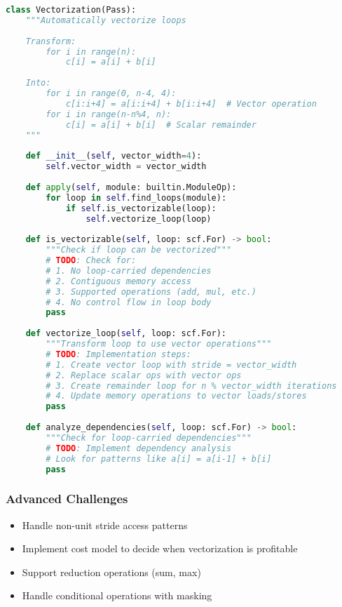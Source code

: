 \documentclass[11pt,a4paper]{article}
\begin{document}
\begin{lstlisting}[language=Python, caption=Exercise: Auto-Vectorization]
class Vectorization(Pass):
    """Automatically vectorize loops
    
    Transform:
        for i in range(n):
            c[i] = a[i] + b[i]
    
    Into:
        for i in range(0, n-4, 4):
            c[i:i+4] = a[i:i+4] + b[i:i+4]  # Vector operation
        for i in range(n-n%4, n):
            c[i] = a[i] + b[i]  # Scalar remainder
    """
    
    def __init__(self, vector_width=4):
        self.vector_width = vector_width
    
    def apply(self, module: builtin.ModuleOp):
        for loop in self.find_loops(module):
            if self.is_vectorizable(loop):
                self.vectorize_loop(loop)
    
    def is_vectorizable(self, loop: scf.For) -> bool:
        """Check if loop can be vectorized"""
        # TODO: Check for:
        # 1. No loop-carried dependencies
        # 2. Contiguous memory access
        # 3. Supported operations (add, mul, etc.)
        # 4. No control flow in loop body
        pass
    
    def vectorize_loop(self, loop: scf.For):
        """Transform loop to use vector operations"""
        # TODO: Implementation steps:
        # 1. Create vector loop with stride = vector_width
        # 2. Replace scalar ops with vector ops
        # 3. Create remainder loop for n % vector_width iterations
        # 4. Update memory operations to vector loads/stores
        pass
    
    def analyze_dependencies(self, loop: scf.For) -> bool:
        """Check for loop-carried dependencies"""
        # TODO: Implement dependency analysis
        # Look for patterns like a[i] = a[i-1] + b[i]
        pass
\end{lstlisting}

\subsubsection{Advanced Challenges}
\begin{itemize}
    \item Handle non-unit stride access patterns
    \item Implement cost model to decide when vectorization is profitable
    \item Support reduction operations (sum, max)
    \item Handle conditional operations with masking
\end{itemize}
\end{document}

